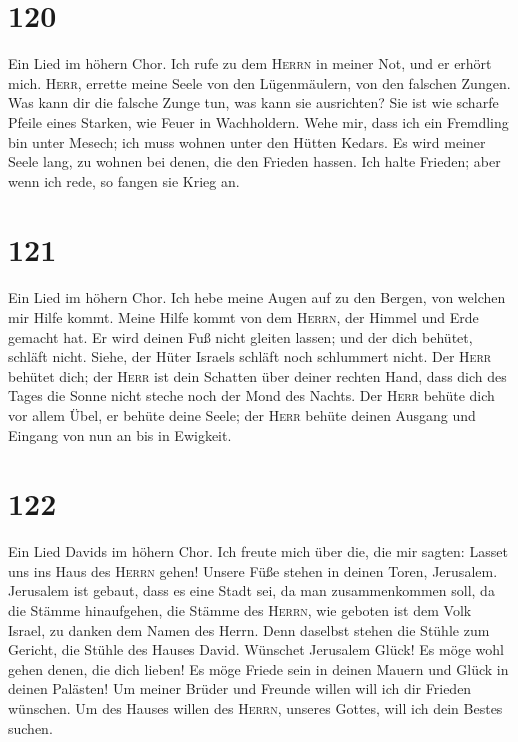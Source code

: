 \hypertarget{section-119}{%
\section{120}\label{section-119}}

 Ein Lied im höhern Chor. Ich rufe zu dem \textsc{Herrn}
in meiner Not, und er erhört mich.  \textsc{Herr}, errette
meine Seele von den Lügenmäulern, von den falschen Zungen.
 Was kann dir die falsche Zunge tun, was kann sie
ausrichten?  Sie ist wie scharfe Pfeile eines Starken, wie
Feuer in Wachholdern.  Wehe mir, dass ich ein Fremdling
bin unter Mesech; ich muss wohnen unter den Hütten Kedars.
 Es wird meiner Seele lang, zu wohnen bei denen, die den
Frieden hassen.  Ich halte Frieden; aber wenn ich rede, so
fangen sie Krieg an.

\hypertarget{section-120}{%
\section{121}\label{section-120}}

 Ein Lied im höhern Chor. Ich hebe meine Augen auf zu den
Bergen, von welchen mir Hilfe kommt.  Meine Hilfe kommt
von dem \textsc{Herrn}, der Himmel und Erde gemacht hat. 
Er wird deinen Fuß nicht gleiten lassen; und der dich behütet, schläft
nicht.  Siehe, der Hüter Israels schläft noch schlummert
nicht.  Der \textsc{Herr} behütet dich; der \textsc{Herr}
ist dein Schatten über deiner rechten Hand,  dass dich des
Tages die Sonne nicht steche noch der Mond des Nachts. 
Der \textsc{Herr} behüte dich vor allem Übel, er behüte deine Seele;
 der \textsc{Herr} behüte deinen Ausgang und Eingang von
nun an bis in Ewigkeit.

\hypertarget{section-121}{%
\section{122}\label{section-121}}

 Ein Lied Davids im höhern Chor. Ich freute mich über die,
die mir sagten: Lasset uns ins Haus des \textsc{Herrn} gehen!
 Unsere Füße stehen in deinen Toren, Jerusalem.
 Jerusalem ist gebaut, dass es eine Stadt sei, da man
zusammenkommen soll,  da die Stämme hinaufgehen, die
Stämme des \textsc{Herrn}, wie geboten ist dem Volk Israel, zu danken
dem Namen des Herrn.  Denn daselbst stehen die Stühle zum
Gericht, die Stühle des Hauses David.  Wünschet Jerusalem
Glück! Es möge wohl gehen denen, die dich lieben!  Es möge
Friede sein in deinen Mauern und Glück in deinen Palästen!
 Um meiner Brüder und Freunde willen will ich dir Frieden
wünschen.  Um des Hauses willen des \textsc{Herrn},
unseres Gottes, will ich dein Bestes suchen.

